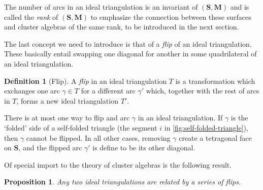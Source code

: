 \documentclass[a4paper,oneside,svgnames,draft]{amsart}
\theoremstyle{plain}
\newtheorem{proposition}[theorem]{Proposition}
\theoremstyle{definition}
\newtheorem{definition}[theorem]{Definition}
\begin{document}
 The number of arcs in an ideal triangulation is an invariant of
 $(\mathbf{S},\mathbf{M})$ and is called the \emph{rank} of
 $(\mathbf{S},\mathbf{M})$ to emphasize the connection between these surfaces
 and cluster algebras of the same rank, to be introduced in the next section.

 The last concept we need to introduce is that of a \emph{flip} of an ideal
 triangulation. These basically entail swapping one diagonal for another in some
 quadrilateral of an ideal triangulation.

 \begin{definition}[Flip]
  A \emph{flip} in an ideal triangulation $T$ is a transformation which
  exchanges one arc $\gamma \in T$ for a different arc $\gamma'$ which, together
  with the rest of arcs in $T$, forms a new ideal triangulation $T'$.
 \end{definition}

 There is at most one way to flip and arc $\gamma$ in an ideal triangulation. If
 $\gamma$ is the `folded' side of a self-folded triangle (the segment $i$ in
 \cref{fig:self-folded-triangle}), then $\gamma$ cannot be flipped. In all other
 cases, removing $\gamma$ create a tetragonal face on $\mathbf{S}$, and the
 flipped arc $\gamma'$ is define to be its other diagonal.

 Of special import to the theory of cluster algebras is the following result.

 \begin{proposition}
  Any two ideal triangulations are related by a series of flips.
 \end{proposition}
\end{document}
